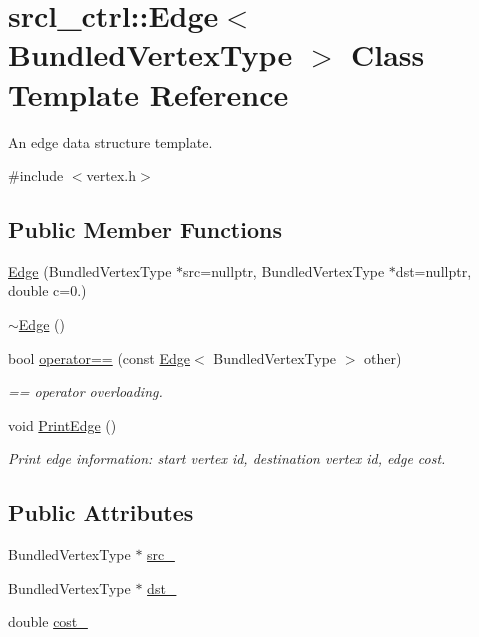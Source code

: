 \hypertarget{classsrcl__ctrl_1_1Edge}{\section{srcl\-\_\-ctrl\-:\-:Edge$<$ Bundled\-Vertex\-Type $>$ Class Template Reference}
\label{classsrcl__ctrl_1_1Edge}
}


An edge data structure template.  




{\ttfamily \#include $<$vertex.\-h$>$}

\subsection*{Public Member Functions}
\begin{DoxyCompactItemize}
\item 
\hyperlink{classsrcl__ctrl_1_1Edge_ade0b87f7eca965e8a9bab20254a5011e}{Edge} (Bundled\-Vertex\-Type $\ast$src=nullptr, Bundled\-Vertex\-Type $\ast$dst=nullptr, double c=0.)
\item 
\hyperlink{classsrcl__ctrl_1_1Edge_afba9527d44eab4e14a8e9198c567d1ff}{$\sim$\-Edge} ()
\item 
bool \hyperlink{classsrcl__ctrl_1_1Edge_aabb859828b19d780bdff0122e088795a}{operator==} (const \hyperlink{classsrcl__ctrl_1_1Edge}{Edge}$<$ Bundled\-Vertex\-Type $>$ other)
\begin{DoxyCompactList}\small\item\em == operator overloading. \end{DoxyCompactList}\item 
void \hyperlink{classsrcl__ctrl_1_1Edge_a41dbd6480882c572605a86e523e82fd5}{Print\-Edge} ()
\begin{DoxyCompactList}\small\item\em Print edge information\-: start vertex id, destination vertex id, edge cost. \end{DoxyCompactList}\end{DoxyCompactItemize}
\subsection*{Public Attributes}
\begin{DoxyCompactItemize}
\item 
Bundled\-Vertex\-Type $\ast$ \hyperlink{classsrcl__ctrl_1_1Edge_a2403b33c073ea4730a897cd9d2cb5216}{src\-\_\-}
\item 
Bundled\-Vertex\-Type $\ast$ \hyperlink{classsrcl__ctrl_1_1Edge_a89a55fd037800ae1cfe32e0b4475500e}{dst\-\_\-}
\item 
double \hyperlink{classsrcl__ctrl_1_1Edge_a96acac663e9aad716e361510f4862a0b}{cost\-\_\-}
\end{DoxyCompactItemize}


